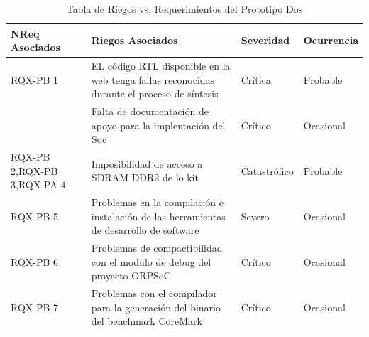 		\begin{table}[h!]
		\centering
		\begin{tabular}{ p{2.5cm} p{9cm} p{2cm} p{2cm} }
		\hline 
		\rowcolor[gray]{0.8} N\textordmasculine Req Asociados& Riegos Asociados & Severidad  & Ocurrencia \\
		\hline
		RQX-PB 1& EL código RTL disponible en la web tenga fallas reconocidas durante el proceso de síntesis & Crítica       & Probable \\
		\hline				
				& Falta de documentación de apoyo para la implentación
del Soc & Crítico & Ocasional\\	 
		\hline
		RQX-PB 2,RQX-PB 3,RQX-PA 4 & Imposibilidad de acceso a SDRAM DDR2 de lo kit& Catastrófico & Probable\\
		\hline
		RQX-PB 5&Problemas en la compilación e instalación de las herramientas de desarrollo de software  & Severo  &  Ocasional\\ 
		\hline
		RQX-PB 6& Problemas de compactibilidad con el modulo de debug del proyecto ORPSoC  & Crítico&  Ocasional\\
		\hline
		RQX-PB 7 & Problemas con el compilador para la generación del binario del benchmark CoreMark  & Crítico&  Ocasional\\
		\hline
		\end{tabular}
		\caption{Tabla de Riegos vs. Requerimientos del Prototipo Dos}
		\end{table}

\newpage

